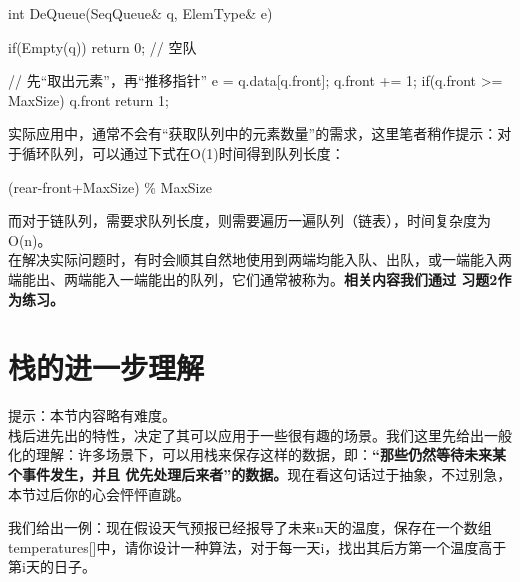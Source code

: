 \begin{cppcode}
    int DeQueue(SeqQueue& q, ElemType& e) {
        if(Empty(q)) {
            return 0;   // 空队
        }

        // 先“取出元素”，再“推移指针”
        e = q.data[q.front];
        q.front += 1;
        if(q.front >= MaxSize) {
            q.front %
        }
        return 1;
    }
\end{cppcode}

实际应用中，通常不会有“获取队列中的元素数量”的需求，这里笔者稍作提示：对于循环队列，可以通过下式在O(1)时间得到队列长度：
\begin{bulk}
    \begin{center}
        (rear-front+MaxSize) \% MaxSize
    \end{center}
\end{bulk}
而对于链队列，需要求队列长度，则需要遍历一遍队列（链表），时间复杂度为O(n)。\\

在解决实际问题时，有时会顺其自然地使用到两端均能入队、出队，或一端能入两端能出、两端能入一端能出的队列，它们通常被称为。{\color{red}\textbf{相关内容我们通过
习题2作为练习。}}

\section{栈的进一步理解}
提示：本节内容略有难度。\\


栈后进先出的特性，决定了其可以应用于一些很有趣的场景。我们这里先给出一般化的理解：许多场景下，可以用栈来保存这样的数据，即：\textbf{“那些仍然等待未来某个事件发生，并且
优先处理后来者”的数据。}现在看这句话过于抽象，不过别急，本节过后你的心会怦怦直跳。


我们给出一例：现在假设天气预报已经报导了未来n天的温度，保存在一个数组temperatures[]中，请你设计一种算法，对于每一天i，找出其后方第一个温度高于第i天的日子。

